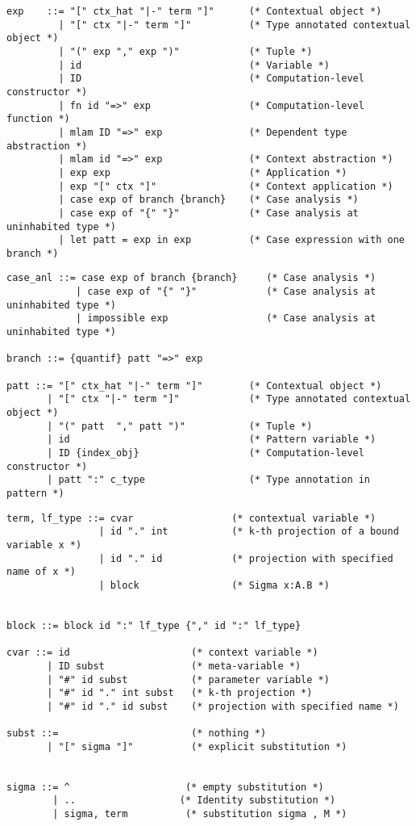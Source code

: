 \documentclass[11pt]{article}
\begin{document}
\begin{verbatim}
exp    ::= "[" ctx_hat "|-" term "]"      (* Contextual object *)
         | "[" ctx "|-" term "]"          (* Type annotated contextual object *)
         | "(" exp "," exp ")"            (* Tuple *)
         | id                             (* Variable *)
         | ID                             (* Computation-level constructor *)
         | fn id "=>" exp                 (* Computation-level function *)
         | mlam ID "=>" exp               (* Dependent type abstraction *)
         | mlam id "=>" exp               (* Context abstraction *)
         | exp exp                        (* Application *)
         | exp "[" ctx "]"                (* Context application *)
         | case exp of branch {branch}    (* Case analysis *)
         | case exp of "{" "}"            (* Case analysis at uninhabited type *)
         | let patt = exp in exp          (* Case expression with one branch *)

\end{verbatim}

\begin{verbatim}
case_anl ::= case exp of branch {branch}     (* Case analysis *)
            | case exp of "{" "}"            (* Case analysis at uninhabited type *)
            | impossible exp                 (* Case analysis at uninhabited type *)

branch ::= {quantif} patt "=>" exp

patt ::= "[" ctx_hat "|-" term "]"        (* Contextual object *)
       | "[" ctx "|-" term "]"            (* Type annotated contextual object *)
       | "(" patt  "," patt ")"           (* Tuple *)
       | id                               (* Pattern variable *)
       | ID {index_obj}                   (* Computation-level constructor *)
       | patt ":" c_type                  (* Type annotation in pattern *)
\end{verbatim}

\begin{verbatim}
term, lf_type ::= cvar                 (* contextual variable *)
                | id "." int           (* k-th projection of a bound variable x *)
                | id "." id            (* projection with specified name of x *)
                | block                (* Sigma x:A.B *)


block ::= block id ":" lf_type {"," id ":" lf_type}

cvar ::= id                     (* context variable *)
       | ID subst               (* meta-variable *)
       | "#" id subst           (* parameter variable *)
       | "#" id "." int subst   (* k-th projection *)
       | "#" id "." id subst    (* projection with specified name *)

subst ::=                       (* nothing *)
       | "[" sigma "]"          (* explicit substitution *)


sigma ::= ^                    (* empty substitution *)
        | ..                  (* Identity substitution *)
        | sigma, term          (* substitution sigma , M *)

\end{verbatim}
\end{document}
